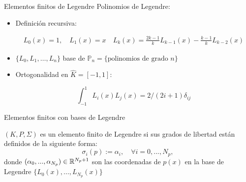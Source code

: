 \documentclass[10pt,leqno]{beamer}
\newcommand{\Np}{{N_p}}
\newcommand{\refelem}{\widehat}
\begin{document}
\begin{frame}{Elementos finitos de Legendre}
  Polinomios de Legendre:
  \begin{itemize}
  \item Definición recursiva:
    \begin{footnotesize}
      \begin{align*}
        L_0(x)=1, \quad L_1(x)=x \quad L_{k}(x) = \frac{2k-1}k L_{k-1}(x) - \frac{k-1}{k} L_{k-2}(x)
      \end{align*}
    \end{footnotesize}
  \item $\{L_0,L_1,\dots,L_n\}$ base de $\mathbb{P}_n=\{\text{polinomios de grado } n\}$
  \item Ortogonalidad en $\refelem K=[-1,1]$:
    \begin{footnotesize}
      $$\int_{-1}^1 L_i(x) L_j(x) = 2/(2i+1)\delta_{ij}$$
    \end{footnotesize}
  \end{itemize}

  Elementos finitos con bases de Legendre
  \begin{definition} $(K,P,\Sigma)$ es un \alert{elemento finito de
      Legendre} si sus grados de libertad están definidos de la
    siguiente forma:
    $$
    \sigma_i(p) := \alpha_i, \quad \forall i=0,...,\Np,
    $$
    donde $(\alpha_0,...,\alpha_\Np) \in\Rset^{\Np+1}$ son las coordenadas
    de $p(x)$ en la base de Legendre $\{L_0(x),...,L_\Np(x)\}$
  \end{definition}

\end{frame}

{}
\end{document}
